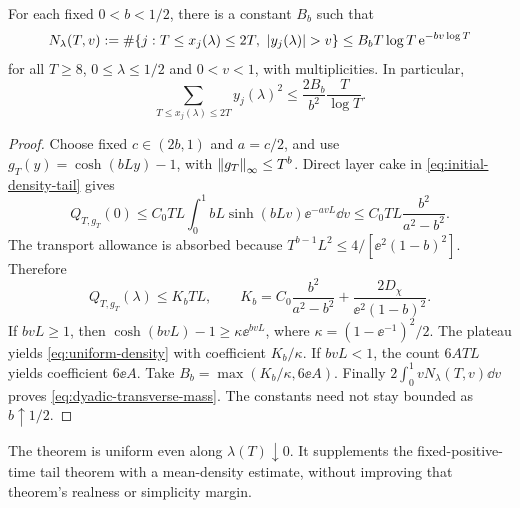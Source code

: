\begin{theorem}\label{thm:uniform-density}
For each fixed \(0<b<1/2\), there is a constant \(B_b\) such that
\begin{equation}\label{eq:uniform-density}
 N_\lambda(T,v):=\#\{j:T\le x_j(\lambda)\le2T,
                          \ \abs{y_j(\lambda)}>v\}
 \le B_bT\log T\,\ee^{-bv\log T}
\end{equation}
for all \(T\ge8\), \(0\le\lambda\le1/2\) and \(0<v<1\),
with multiplicities. In particular,
\begin{equation}\label{eq:dyadic-transverse-mass}
 \sum_{T\le x_j(\lambda)\le2T}y_j(\lambda)^2
 \le\frac{2B_b}{b^2}\frac{T}{\log T}.
\end{equation}
\end{theorem}
\begin{proof}
Choose fixed \(c\in(2b,1)\) and \(a=c/2\), and use
\(g_T(y)=\cosh(bLy)-1\), with \(\left\lVert g_T\right\rVert_\infty\le T^b\).
Direct layer cake in \eqref{eq:initial-density-tail} gives
\[
 Q_{T,g_T}(0)\le C_0TL\int_0^1 bL\sinh(bLv)\ee^{-avL}\dd v
 \le C_0TL\frac{b^2}{a^2-b^2}.
\]
The transport allowance is absorbed because
\(T^{b-1}L^2\le4/[\ee^2(1-b)^2]\). Therefore
\[
 Q_{T,g_T}(\lambda)\le K_bTL,\qquad
 K_b=C_0\frac{b^2}{a^2-b^2}+
                   \frac{2D_\chi}{\ee^2(1-b)^2}.
\]
If \(bvL\ge1\), then
\(\cosh(bvL)-1\ge\kappa\ee^{bvL}\), where
\(\kappa=(1-\ee^{-1})^2/2\). The plateau yields
\eqref{eq:uniform-density} with coefficient \(K_b/\kappa\).
If \(bvL<1\), the count \(6ATL\) yields coefficient \(6\ee A\).
Take \(B_b=\max(K_b/\kappa,6\ee A)\).
Finally \(2\int_0^1vN_\lambda(T,v)\dd v\) proves
\eqref{eq:dyadic-transverse-mass}. The constants need not stay bounded
as \(b\uparrow1/2\).
\end{proof}
The theorem is uniform even along \(\lambda(T)\downarrow0\).
It supplements the fixed-positive-time tail theorem with a mean-density
estimate, without improving that theorem's realness or simplicity margin.

